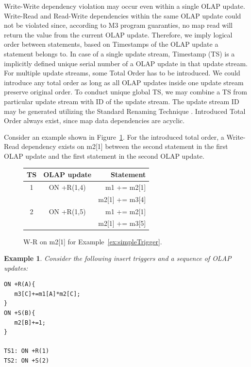 \documentclass{sig-semester}
\newtheorem{example}[theorem]{Example}
\def\OLAP{OLAP\xspace}
\def\M3{M3\xspace}
\begin{document}
Write-Write dependency violation may occur even within a single \OLAP update. Write-Read and Read-Write dependencies within the same \OLAP update could not be violated since, according to \M3 program guaranties, no map read will return the value from the current \OLAP update. Therefore, we imply logical order between statements, based on Timestamps of the \OLAP update a statement belongs to. In case of a single update stream, Timestamp (TS) is a implicitly defined unique serial number of a \OLAP update in that update stream. For multiple update streams, some Total Order has to be introduced. We could introduce any total order as long as all \OLAP updates inside one update stream preserve original order. To conduct unique global TS, we may combine a TS from particular update stream with ID of the update stream. The update stream ID may be generated utilizing the Standard Renaming Technique \cite{Welch04}. Introduced Total Order always exist, since map data dependencies are acyclic.

Consider an example shown in Figure~\ref{fig:streamWR}. For the introduced total order, a Write-Read dependency exists on m2[1] between the second statement in the first \OLAP update and the first statement in the second \OLAP update.

\begin{figure}
\begin{center}

\begin{tabular}{c|c|r}
TS & \OLAP update & Statement\\
\hline
1 & ON +R(1,4) & m1 += m2[1]    \\
  &            & m2[1] += m3[4] \\
\hline
2 & ON +R(1,5) & m1 += m2[1]    \\
  &            & m2[1] += m3[5] \\
\end{tabular}
\end{center}

\vspace{-3mm}
\caption{W-R on m2[1] for Example~\ref{ex:simpleTrigger}.}
\label{fig:streamWR}
\vspace{-2mm}
\end{figure}



\begin{example} \em
\label{ex:foreachTrigger}
Consider the following insert triggers and a sequence of \OLAP updates:
\begin{verbatim}
ON +R(A){
   m3[C]+=m1[A]*m2[C];
}
ON +S(B){
   m2[B]+=1;
}

TS1: ON +R(1)
TS2: ON +S(2)
\end{verbatim}
\end{example}
\end{document}
